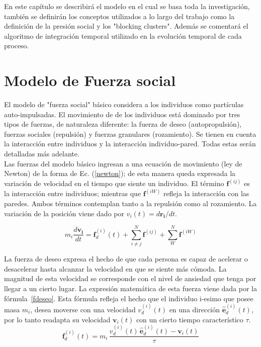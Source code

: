 \label{marco_teo}

En este capítulo se describirá el modelo en el cual se basa toda la investigación, también se definirán los conceptos utilizados a lo largo del trabajo como la definición de la presión social y los "blocking clusters". Además se comentará el algoritmo de integración temporal utilizado en la evolución temporal de cada proceso. 

\section{\label{sfm}Modelo de Fuerza social}

El modelo de "fuerza social" básico considera a los individuos como partículas auto-impulsadas. El movimiento de de los individuos está dominado por tres tipos de fuerzas, de naturaleza diferente: la fuerza de deseo (autopropulsión), fuerzas sociales (repulsión) y fuerzas granulares (rozamiento). Se tienen en cuenta la interacción entre individuos y la interacción individuo-pared. Todas estas serán detalladas más adelante.   \\

Las fuerzas del modelo básico ingresan a una ecuación de movimiento (ley de Newton) de la forma de Ec. (\ref{newton}); de esta manera queda expresada la variación de velocidad en el tiempo que siente un individuo. El término $\mathbf{f}^{(ij)}$ es la interacción entre individuos; mientras que $\mathbf{f}^{(iW)}$ refleja la interacción con las paredes. Ambos términos contemplan tanto a la repulsión como al rozamiento. La variación de la  posición viene dado por $v_{i}(t)=d\mathbf{r_i}/dt$.

\begin{equation}
m_i\frac{d\mathbf{v_i}}{dt}=\mathbf{f}_d^ {(i)}(t)+ \sum_{i\neq j}^{N}\mathbf{f}^{(ij)} + \sum_{W}^{N}\mathbf{f}^{(iW)}
\label{newton}
\end{equation} 

La fuerza de deseo expresa el hecho de que cada persona es capaz de  acelerar o desacelerar hasta alcanzar la velocidad en que se siente más cómoda. La magnitud de esta velocidad se corresponde con el nivel de ansiedad que tenga por llegar a un cierto lugar. La expresión matemática de esta fuerza viene dada por la fórmula~\ref{fdeseo}. Esta fórmula refleja el hecho que el individuo i-esimo que posee masa $m_i$, desea  moverse con una velocidad $v_d^ {(i)}(t)$ en una dirección $\hat{\mathbf{e}}_d^ {(i)}(t)$, por lo tanto readapta su velocidad $\mathbf{v}_i(t)$ con un cierto tiempo característico $\tau$.
\begin{equation}
\mathbf{f}_d^ {(i)}(t)=m_i\,\displaystyle\frac{v_d^ {(i)}(t)\,\hat{\mathbf{e}}_d^ {(i)}(t)-\mathbf{v}_i(t)}{\tau}\label{fdeseo}
\end{equation}

